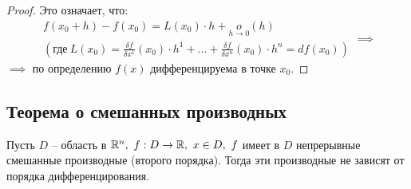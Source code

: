 \begin{proof}
    Это означает, что:
    \[
        \begin{array}{c}
            f(x_0 + h) - f(x_0) = L(x_0)\cdot h + \underset{h\rightarrow0}{o}(h) \\
            \left(\text{где} \ L(x_0) = \frac{\delta f}{\delta x^1}(x_0)\cdot h^1 + \ldots + \frac{\delta f}{\delta x^n}(x_0) \cdot h^n = df(x_0)\right)
        \end{array} \implies
    \]$\implies$ по определению $f(x)$ дифференцируема в точке $x_0$.
\end{proof}

\setcounter{subsection}{8}

\subsection{Теорема о смешанных производных}

\begin{theorem}
    Пусть $ D $ -- область в $ \mathbb{R}^n, \ f: D \rightarrow\mathbb{R}, \ x \in D, \ f $ имеет в $ D $ непрерывные смешанные производные (второго порядка). Тогда эти производные не зависят от порядка дифференцирования.
\end{theorem}

